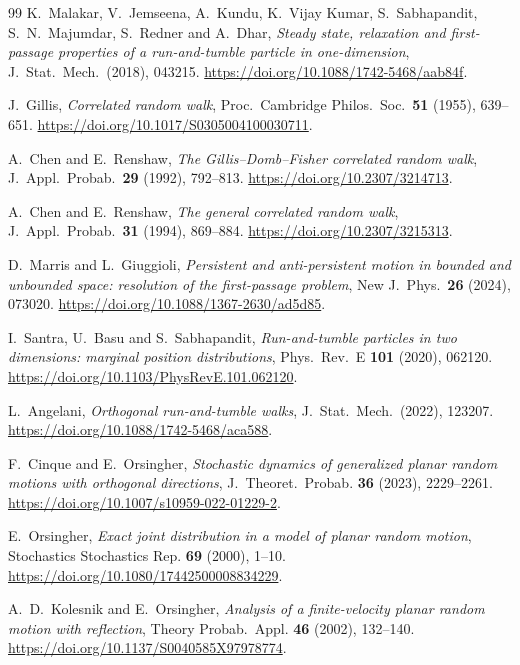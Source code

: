 \documentclass[11pt]{article}
\theoremstyle{definition}
\theoremstyle{remark}
\begin{document}
\begin{thebibliography}{99}
K.~Malakar, V.~Jemseena, A.~Kundu, K.~Vijay Kumar, S.~Sabhapandit,
S.~N.~Majumdar, S.~Redner and A.~Dhar, \emph{Steady state, relaxation and
first-passage properties of a run-and-tumble particle in one-dimension},
J.~Stat.~Mech.~(2018), 043215.
\url{https://doi.org/10.1088/1742-5468/aab84f}.

J.~Gillis, \emph{Correlated random walk}, Proc.~Cambridge Philos.~Soc.~\textbf{51}
(1955), 639--651. \url{https://doi.org/10.1017/S0305004100030711}.

A.~Chen and E.~Renshaw, \emph{The Gillis--Domb--Fisher correlated random
walk}, J.~Appl.~Probab.~\textbf{29} (1992), 792--813.
\url{https://doi.org/10.2307/3214713}.

A.~Chen and E.~Renshaw, \emph{The general correlated random walk},
J.~Appl.~Probab.~\textbf{31} (1994), 869--884.
\url{https://doi.org/10.2307/3215313}.

D.~Marris and L.~Giuggioli, \emph{Persistent and anti-persistent motion in
bounded and unbounded space: resolution of the first-passage problem},
New J.~Phys.~\textbf{26} (2024), 073020.
\url{https://doi.org/10.1088/1367-2630/ad5d85}.

I.~Santra, U.~Basu and S.~Sabhapandit, \emph{Run-and-tumble particles in two
dimensions: marginal position distributions}, Phys.~Rev.~E \textbf{101}
(2020), 062120. \url{https://doi.org/10.1103/PhysRevE.101.062120}.

L.~Angelani, \emph{Orthogonal run-and-tumble walks}, J.~Stat.~Mech.~(2022),
123207. \url{https://doi.org/10.1088/1742-5468/aca588}.

F.~Cinque and E.~Orsingher, \emph{Stochastic dynamics of generalized planar
random motions with orthogonal directions}, J.~Theoret.~Probab. \textbf{36}
(2023), 2229--2261. \url{https://doi.org/10.1007/s10959-022-01229-2}.

E.~Orsingher, \emph{Exact joint distribution in a model of planar random
motion}, Stochastics Stochastics Rep. \textbf{69} (2000), 1--10.
\url{https://doi.org/10.1080/17442500008834229}.

A.~D.~Kolesnik and E.~Orsingher, \emph{Analysis of a finite-velocity planar
random motion with reflection}, Theory Probab.~Appl. \textbf{46} (2002),
132--140. \url{https://doi.org/10.1137/S0040585X97978774}.


\end{thebibliography}
\end{document}
